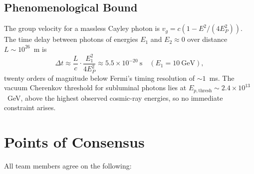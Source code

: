 \documentclass[11pt,a4paper]{article}
\begin{document}
\subsection{Phenomenological Bound}

The group velocity for a massless Cayley photon is $v_g = c\!\left(1-E^2/(4E_P^2)\right)$. The time delay between photons of energies $E_1$ and $E_2\approx 0$ over distance $L\sim 10^{26}$~m is
\begin{equation}\label{eq:12}
  \Delta t \approx \frac{L}{c}\cdot\frac{E_1^2}{4E_P^2} \approx 5.5\times10^{-20}~\text{s}
  \quad (E_1=10~\text{GeV}),
\end{equation}
twenty orders of magnitude below Fermi's timing resolution of $\sim 1$~ms. The vacuum Cherenkov threshold for subluminal photons lies at $E_{p,\mathrm{thresh}}\sim 2.4\times10^{13}$~GeV, above the highest observed cosmic-ray energies, so no immediate constraint arises.

\section{Points of Consensus}\label{sec:consensus}

All team members agree on the following:
\end{document}
